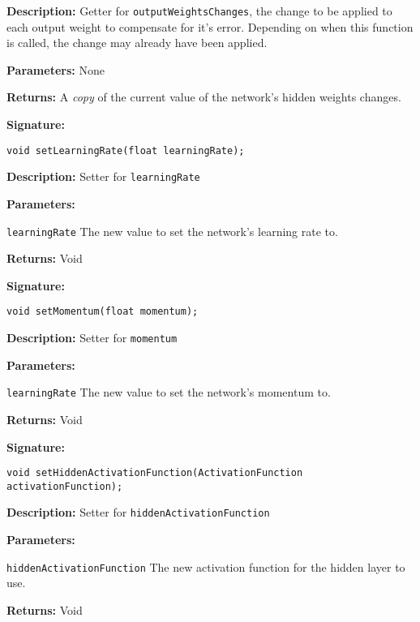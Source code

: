 \documentclass[a4paper]{article}
\begin{document}
\textbf{Description: }
Getter for \lstinline{outputWeightsChanges}, the change to be applied to each output weight to compensate for it's error. Depending on when this function is called, the change may already have been applied.

\textbf{Parameters: } None

\textbf{Returns: }
A \textit{copy} of the current value of the network's hidden weights changes.

\hrulefill %

\textbf{Signature:} \begin{lstlisting}
void setLearningRate(float learningRate);
\end{lstlisting}

\textbf{Description: }
Setter for \lstinline{learningRate}

\textbf{Parameters: }

\lstinline{learningRate} The new value to set the network's learning rate to.

\textbf{Returns: } Void

\hrulefill %

\textbf{Signature:} \begin{lstlisting}
void setMomentum(float momentum);
\end{lstlisting}

\textbf{Description: }
Setter for \lstinline{momentum}

\textbf{Parameters: }

\lstinline{learningRate} The new value to set the network's momentum to.

\textbf{Returns: } Void

\hrulefill %

\textbf{Signature:} \begin{lstlisting}
void setHiddenActivationFunction(ActivationFunction activationFunction);
\end{lstlisting}

\textbf{Description: }
Setter for \lstinline{hiddenActivationFunction}

\textbf{Parameters: }

\lstinline{hiddenActivationFunction} The new activation function for the hidden layer to use.

\textbf{Returns: } Void

\hrulefill %
\end{document}

